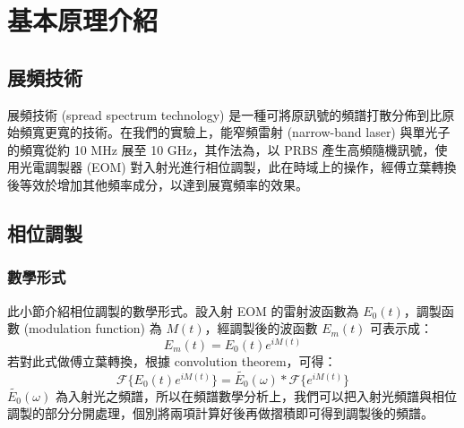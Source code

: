 \documentclass[class=NCU_thesis, crop=false]{standalone}
\begin{document}
\chapter{基本原理介紹}

\section{展頻技術}

展頻技術 (spread spectrum technology) 是一種可將原訊號的頻譜打散分佈到比原始頻寬更寬的技術。在我們的實驗上，能窄頻雷射 (narrow-band laser) 與單光子的頻寬從約 10 MHz 展至 10 GHz，其作法為，以 PRBS 產生高頻隨機訊號，使用光電調製器 (EOM) 對入射光進行相位調製，此在時域上的操作，經傅立葉轉換後等效於增加其他頻率成分，以達到展寬頻率的效果。
\section{相位調製}

\subsection{數學形式}
此小節介紹相位調製的數學形式。設入射 EOM 的雷射波函數為 $E_{0}(t)$，調製函數 (modulation function) 為 $M(t)$，經調製後的波函數 $E_{m}(t)$ 可表示成：
\begin{equation}
    E_{m}(t)=E_{0}(t)e^{iM(t)}
\end{equation}
若對此式做傅立葉轉換，根據 convolution theorem，可得：
\begin{equation}
\label{eq:modulation_function}
    \mathscr{F}\{E_{0}(t)e^{iM(t)}\}=\tilde{E_{0}}(\omega)*\mathscr{F}\{{e^{iM(t)}}\}
\end{equation}
$\tilde{E_{0}}(\omega)$ 為入射光之頻譜，所以在頻譜數學分析上，我們可以把入射光頻譜與相位調製的部分分開處理，個別將兩項計算好後再做摺積即可得到調製後的頻譜。
\end{document}

